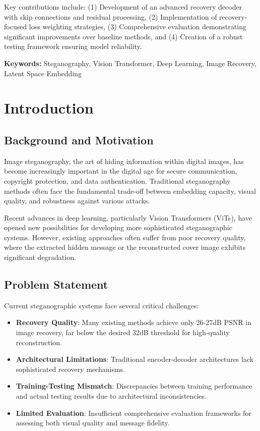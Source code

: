\documentclass[12pt,a4paper]{report}
\begin{document}
Key contributions include: (1) Development of an advanced recovery decoder with skip connections and residual processing, (2) Implementation of recovery-focused loss weighting strategies, (3) Comprehensive evaluation demonstrating significant improvements over baseline methods, and (4) Creation of a robust testing framework ensuring model reliability.

\textbf{Keywords:} Steganography, Vision Transformer, Deep Learning, Image Recovery, Latent Space Embedding

\tableofcontents
\listoffigures
\listoftables

\chapter{Introduction}
\label{ch:introduction}

\section{Background and Motivation}

Image steganography, the art of hiding information within digital images, has become increasingly important in the digital age for secure communication, copyright protection, and data authentication. Traditional steganography methods often face the fundamental trade-off between embedding capacity, visual quality, and robustness against various attacks.

Recent advances in deep learning, particularly Vision Transformers (ViTs), have opened new possibilities for developing more sophisticated steganographic systems. However, existing approaches often suffer from poor recovery quality, where the extracted hidden message or the reconstructed cover image exhibits significant degradation.

\section{Problem Statement}

Current steganographic systems face several critical challenges:

\begin{itemize}
    \item \textbf{Recovery Quality}: Many existing methods achieve only 26-27dB PSNR in image recovery, far below the desired 32dB threshold for high-quality reconstruction.
    \item \textbf{Architectural Limitations}: Traditional encoder-decoder architectures lack sophisticated recovery mechanisms.
    \item \textbf{Training-Testing Mismatch}: Discrepancies between training performance and actual testing results due to architectural inconsistencies.
    \item \textbf{Limited Evaluation}: Insufficient comprehensive evaluation frameworks for assessing both visual quality and message fidelity.
\end{itemize}
\end{document}
